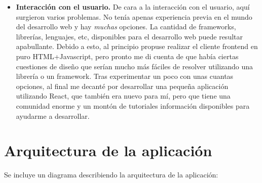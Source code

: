 \begin{itemize}
    Respecto al lenguaje de programación, partíamos de que queríamos utilizar Java para construir nuestro motor, luego no surgieron dudas\footnote{Lenguajes como Kotlin, que también se ejecutan en la JVM (Máquina Virtual de Java), representan opciones válidas para el desarrollo debido a su interoperabilidad con Java, permitiendo un uso mixto de ambos lenguajes en el mismo proyecto.}. Además, esto también esclarecía la cuestión de la plataforma, ya que en un lenguaje JVM\footnote{Java Virtual Machine}, solo tienes que programar de cara a la JVM, sin importar arquitectura o sistema operativo. Sin embargo, sí que hubo que realizar un análisis para determinar que framework podría ayudarnos a atajar el problema de la forma más eficiente, equilibrando el rendimiento real con la dificultad de adaptarse al framework y su curva de dificultad. En este caso, se eligió Spring por encima de otros como Quarkus dado que tenía unas nociones previas en el framework y nos ofrecía un conjunto de herramientas en Spring Boot que iban a simplificar el despliegue y desarrollo de la aplicación notablemente. De cara al frontend, haremos un breve resumen en el siguiente apartado.
    \item \textbf{Interacción con el usuario.} 
    De cara a la interacción con el usuario, aquí surgieron varios problemas. No tenía apenas experiencia previa en el mundo del desarrollo web y hay \textit{muchas} opciones. La cantidad de frameworks, librerías, lenguajes, etc, disponibles para el desarrollo web puede resultar apabullante. Debido a esto, al principio propuse realizar el cliente frontend en puro HTML+Javascript, pero pronto me di cuenta de que había ciertas cuestiones de diseño que serían mucho más fáciles de resolver utilizando una librería o un framework. Tras experimentar un poco con unas cuantas opciones, al final me decanté por desarrollar una pequeña aplicación utilizando React, que también era nuevo para mí, pero que tiene una comunidad enorme y un montón de tutoriales información disponibles para ayudarme a desarrollar. 
\end{itemize}

\section{Arquitectura de la aplicación}
Se incluye un diagrama describiendo la arquitectura de la aplicación:
\begin{landscape}
\end{landscape}
